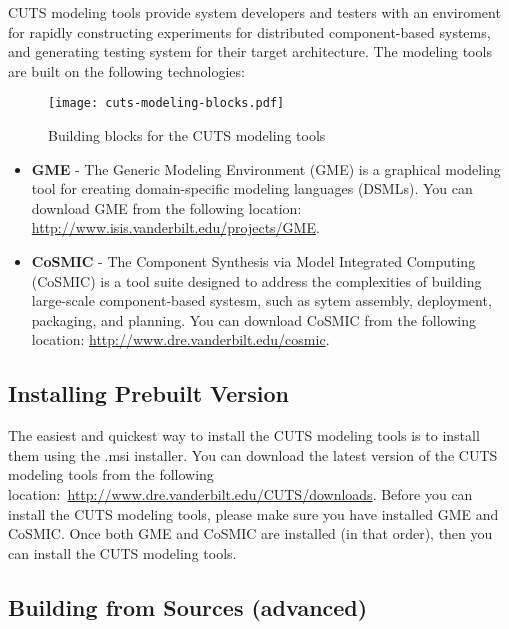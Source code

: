 CUTS modeling tools provide system developers and testers with an enviroment
for rapidly constructing experiments for distributed component-based systems,
and generating testing system for their target architecture. The modeling
tools are built on the following technologies:
\begin{figure}[htbp]
  \centering
  \texttt{[image: cuts-modeling-blocks.pdf]}
  \caption{Building blocks for the CUTS modeling tools}
  \label{fig:cuts-modeling-blocks}
\end{figure}

\begin{itemize}
  \item \textbf{GME} - The Generic Modeling Environment (GME) is a graphical
  modeling tool for creating domain-specific modeling languages (DSMLs). You
  can download GME from the following location: \url{http://www.isis.vanderbilt.edu/projects/GME}.

  \item \textbf{CoSMIC} - The Component Synthesis via Model Integrated 
  Computing (CoSMIC) is a tool suite designed to address the complexities of
  building large-scale component-based systesm, such as sytem assembly, 
  deployment, packaging, and planning. You can download CoSMIC from the following
  location: \url{http://www.dre.vanderbilt.edu/cosmic}.
\end{itemize}

\subsection{Installing Prebuilt Version}

The easiest and quickest way to install the CUTS modeling tools is to install
them using the .msi installer. You can download the latest version of the 
CUTS modeling tools from the following location:~\url{http://www.dre.vanderbilt.edu/CUTS/downloads}.
Before you can install the CUTS modeling tools, please make sure you have
installed GME and CoSMIC. Once both GME and CoSMIC are installed (in that
order), then you can install the CUTS modeling tools.

\subsection{Building from Sources (advanced)}

